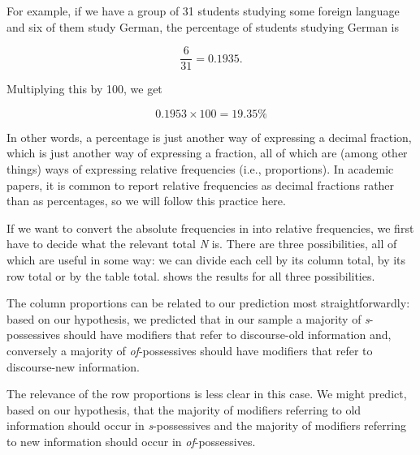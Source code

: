 For example, if we have a group of 31 students studying some foreign language and six of them study German, the percentage of students studying German is

\[\frac{6}{31} = 0.1935.\]

Multiplying this by 100, we get

\[0.1953 \times 100 = 19.35\%\]

In other words, a percentage is just another way of expressing a decimal fraction, which is just another way of expressing a fraction, all of which are (among other things) ways of expressing relative frequencies  (i.e., proportions). In academic papers, it is common to report relative frequencies as decimal fractions rather than as percentages, so we will follow this practice here.

If we want to convert the absolute frequencies  in  into relative frequencies, we first have to decide what the relevant total \emph{N} is. There are three possibilities, all of which are useful in some way: we can divide each cell by its column total, by its row total or by the table total.  shows the results for all three possibilities.

The column proportions can be related to our prediction most straightforwardly: based on our hypothesis,  we predicted that in our sample a majority of \textit{s}-possessives  should have modifiers that refer to discourse\hyp{}old information and, conversely a majority of \textit{of}-possessives  should have modifiers that refer to discourse\hyp{}new information.

The relevance of the row proportions is less clear in this case. We might predict, based on our hypothesis,  that the majority of modifiers referring to old information should occur in \textit{s}-possessives  and the majority of modifiers referring to new information should occur in \textit{of}-possessives.

